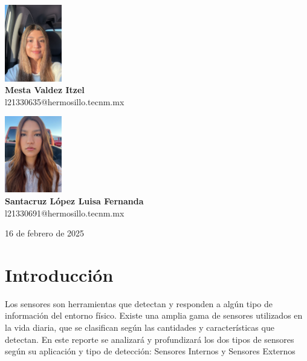 \documentclass{article}
\begin{document}
\begin{titlepage}
\begin{center}
\begin{minipage}{0.45\textwidth}
\begin{center}
				\end{center}
			\end{minipage}
			
			\vspace{0.5cm}
			
			\begin{minipage}{0.45\textwidth}
				\begin{center}
					\includegraphics[width=2.5cm]{itzel.jpg} \\
					\textbf{Mesta Valdez Itzel} \\
					l21330635@hermosillo.tecnm.mx\\
					
				\end{center}
			\end{minipage}
			\hfill
			\begin{minipage}{0.45\textwidth}
				\begin{center}
					\includegraphics[width=2.5cm]{luisa.jpg} \\
					\textbf{Santacruz López Luisa Fernanda} \\
				l21330691@hermosillo.tecnm.mx \\
				\end{center}
			\end{minipage}
			
			\vfill
			16 de febrero de 2025
			
		\end{center}
		
	\end{titlepage}
	
	\tableofcontents
	\newpage
	
	\section{Introducción}
	Los sensores son herramientas que detectan y responden a algún tipo de información del entorno físico. Existe una amplia gama de sensores utilizados en la vida diaria, que se clasifican según las cantidades y características que detectan. En este reporte se analizará y profundizará los dos tipos de sensores según su aplicación y tipo de detección: Sensores Internos y Sensores Externos
	
\end{document}
